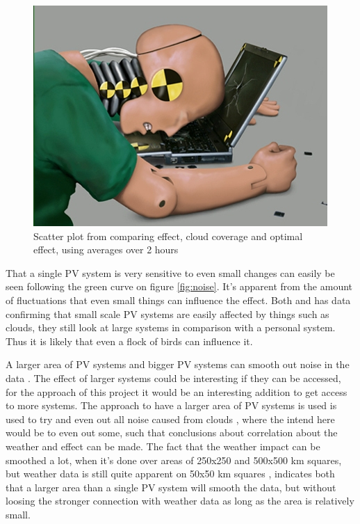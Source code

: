 \begin{figure}
  \centering
  \includegraphics{dummy.jpg}
  \caption{Scatter plot from comparing effect, cloud coverage and
    optimal effect, using averages over 2 hours}
  \label{fig:scatter120}
\end{figure}


That a single PV system is very sensitive to even small changes can
easily be seen following the green curve on figure \ref{fig:noise}.
It's apparent from the amount of fluctuations that even small things
can influence the effect.  Both \citep{cloudTrack} and
\citep{southafrica} has data confirming that small scale PV systems
are easily affected by things such as clouds, they still look at large
systems in comparison with a personal system.  Thus it is likely that
even a flock of birds can influence it.

A larger area of PV systems and bigger PV systems can smooth out noise
in the data \citep{southafrica,cloudTrack}.  The effect of larger
systems could be interesting if they can be accessed, for the approach
of this project it would be an interesting addition to get access to
more systems.  The approach to have a larger area of PV systems is
used is used to try and even out all noise caused from clouds
\citep{southafrica}, where the intend here would be to even out some,
such that conclusions about correlation about the weather and effect
can be made.  The fact that the weather impact can be smoothed a lot,
when it's done over areas of 250x250 and 500x500 km squares, but
weather data is still quite apparent on 50x50 km squares
\citep{southafrica}, indicates both that a larger area than a single
PV system will smooth the data, but without loosing the stronger
connection with weather data as long as the area is relatively small.

